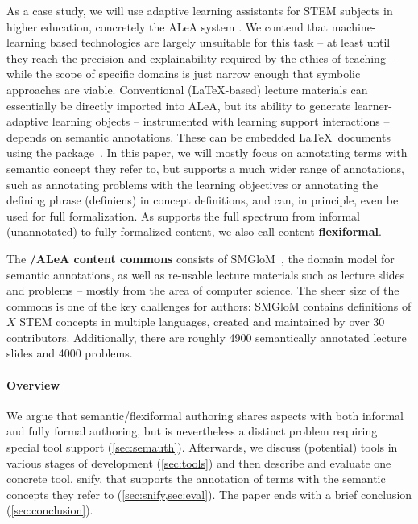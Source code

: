 \documentclass{llncs}
\newcommand\ALeA{\textsf{ALeA}\xspace}
\newcommand\SMGloM{\textsf{SMGloM}\xspace}
\newcommand\snify{\textsf{snify}\xspace}
\begin{document}
As a case study, we will use adaptive learning assistants for STEM subjects in higher education, concretely the \ALeA system \cite{BerBetChu:lssmkm23}.
We contend that machine-learning based technologies are largely unsuitable for this task -- at least until they reach the
precision and explainability required by the ethics of teaching --
while the scope of specific domains is just narrow enough that symbolic approaches are viable.
Conventional (\LaTeX-based) lecture materials can essentially be directly imported into \ALeA,
but its ability to generate learner-adaptive learning objects -- instrumented with learning support interactions --
depends on semantic annotations.
These can be embedded \LaTeX\ documents using the \sTeX package~\cite{MueKo:sdstex22,sTeX:github:on}.
In this paper, we will mostly focus on annotating terms with semantic concept they refer to,
but \sTeX supports a much wider range of annotations, such as annotating problems with the learning objectives
or annotating the defining phrase (definiens) in concept definitions,
and can, in principle, even be used for full formalization.
As \sTeX supports the full spectrum from informal (unannotated) to fully formalized content,
we also call \sTeX content \textbf{flexiformal}.

The \textbf{\sTeX/\ALeA content commons} consists of \SMGloM~\cite{GinIanJuc:spsttom16},
the domain model for semantic annotations,
as well as re-usable lecture materials such as lecture slides and problems -- mostly from the area of computer science.
The sheer size of the commons is one of the key challenges for authors:
\SMGloM contains definitions of $X$ STEM concepts in multiple languages,
created and maintained by over 30 contributors.
Additionally, there are roughly 4900
semantically annotated lecture slides and 4000 problems.

\paragraph{Overview}
We argue that semantic/flexiformal authoring shares aspects with both informal and fully formal authoring,
but is nevertheless a distinct problem requiring special tool support (\cref{sec:semauth}).
Afterwards, we discuss (potential) tools in various stages of development (\cref{sec:tools}) and then
describe and evaluate one concrete tool, \snify, that supports the annotation
of terms with the semantic concepts they refer to (\cref{sec:snify,sec:eval}).
The paper ends with a brief conclusion (\cref{sec:conclusion}).
\end{document}
